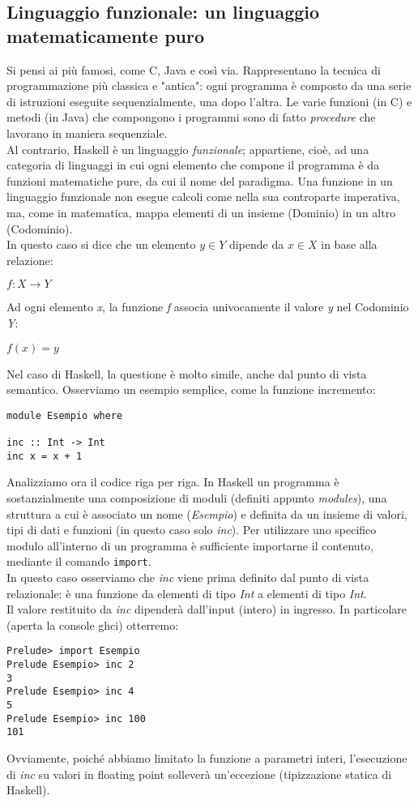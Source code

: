\subsection{Linguaggio funzionale: un linguaggio matematicamente puro}
Si pensi ai più famosi, come C, Java e così via. Rappresentano la tecnica di programmazione più classica e "antica": ogni programma è composto da una serie di istruzioni eseguite sequenzialmente, una dopo l'altra. Le varie funzioni (in C) e metodi (in Java) che compongono i programmi sono di fatto \textit{procedure} che lavorano in maniera sequenziale.\\
Al contrario, Haskell è un linguaggio \textit{funzionale}; appartiene, cioè, ad una categoria di linguaggi  in cui ogni elemento che compone il programma è da funzioni matematiche pure, da cui il nome del paradigma. Una funzione in un linguaggio funzionale non esegue calcoli come nella sua controparte imperativa, ma, come in matematica, mappa elementi di un insieme (Dominio) in un altro (Codominio).\\
In questo caso si dice che un elemento $y \in \textit{Y}$ dipende da $x \in \textit{X}$ in base alla relazione:
\begin{center}
$f:X \to Y$
\end{center}
Ad ogni elemento \textit{x}, la funzione \textit{f} associa univocamente il valore \textit{y} nel Codominio \textit{Y}:
\begin{center}
$f(x) = y$
\end{center}
Nel caso di Haskell, la questione è molto simile, anche dal punto di vista semantico. Osserviamo un esempio semplice, come la funzione incremento:
\begin{verbatim}
module Esempio where

inc :: Int -> Int 
inc x = x + 1
\end{verbatim}
Analizziamo ora il codice riga per riga. In Haskell un programma è sostanzialmente una composizione di moduli (definiti appunto \textit{modules}), una struttura a cui è associato un nome (\textit{Esempio}) e definita da un insieme di valori, tipi di dati e funzioni (in questo caso solo \textit{inc}). Per utilizzare uno specifico modulo all'interno di un programma è sufficiente importarne il contenuto, mediante il comando \texttt{import}.\\
In questo caso osserviamo che \textit{inc} viene prima definito dal punto di vista relazionale: è una funzione da elementi di tipo \textit{Int} a elementi di tipo \textit{Int}.\\
Il valore restituito da \textit{inc} dipenderà dall'input (intero) in ingresso. In particolare (aperta la console ghci) otterremo:
\begin{verbatim}
Prelude> import Esempio
Prelude Esempio> inc 2
3
Prelude Esempio> inc 4
5
Prelude Esempio> inc 100
101
\end{verbatim}
Ovviamente, poiché abbiamo limitato la funzione a parametri interi, l'esecuzione di \textit{inc} su valori in floating point solleverà un'eccezione (tipizzazione statica di Haskell).
